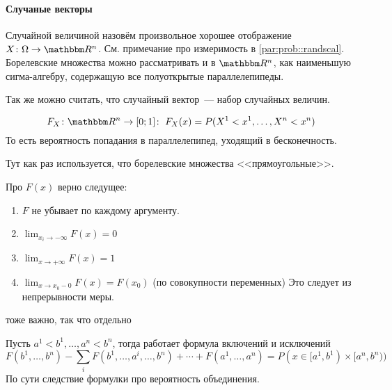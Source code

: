 \documentclass[12pt,timbord]{../../../notes}
\begin{document}
\paragraph{Случаные векторы}
\label{par:stat::randvec}


\begin{defn}\label{defn:prob::randvec::randscal}
  Случайной величиной назовём произвольное хорошее отображение $X\colon \Omega \to \R^n$.
  См. примечание про измеримость в \ref{par:prob::randscal}. Борелевские множества можно рассматривать 
  и в $\R^n$, как наименьшую сигма-алгебру, содержащую все полуоткрытые параллелепипеды.

  Так же можно считать, что случайный вектор~--- набор случайных величин.
\end{defn}


\begin{defn}\label{defn:prob::randvec::distrfun}
  \[
    F_X\colon \R^n\to [0;1] \colon\; F_X(x) = P(X^1 < x^1, \dotsc, X^n < x^n) 
  \]
  То есть вероятность попадания в параллелепипед, уходящий в бесконечность.
\end{defn}
\begin{rem}\label{rem:stat::randvec::distr}
Тут как раз используется, что борелевские множества <<прямоугольные>>.
\end{rem}


\begin{prop}\label{prop:prob::randscal::distrfun}
  Про $F(x)$ верно следущее:
  \begin{enumerate}
    \item $F$ не убывает по каждому аргументу.
    \item $\displaystyle\lim_{x_i\to -\infty}F(x) = 0$
    \item $\displaystyle\lim_{x\to +\infty}F(x) = 1$
    \item $\displaystyle\lim_{x\to x_0-0}F(x) = F(x_0)$ (по совокупности переменных)
      Это следует из непрерывности меры.
  \end{enumerate}
\end{prop}

тоже важно, так что отдельно

\begin{prop}\label{prop:stat::randvec::inc}
  Пусть $a^1 < b^1, \dotsc, a^n < b^n$, тогда работает формула включений и исключений
  \[
    F(b^1, \dotsc, b^n) - \sum_i F(b^1, \dotsc, a^i, \dotsc, b^n) + \dotsb + F(a^1, \dotsc, a^n) = 
  P(x \in [a^1, b^1)\times[a^n,b^n))
  \]
  По сути следствие формулки про вероятность объединения.
\end{prop}
\end{document}
